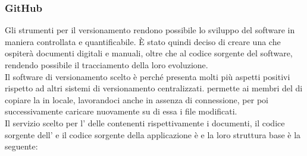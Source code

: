 \subsubsection{GitHub}
Gli strumenti per il versionamento rendono possibile lo sviluppo del software in maniera controllata e quantificabile. È stato quindi deciso di creare una  che ospiterà documenti digitali e manuali, oltre che al codice sorgente del software, rendendo possibile il tracciamento della loro evoluzione. \\
Il software di versionamento scelto è  perché presenta molti più aspetti positivi rispetto ad altri sistemi di versionamento centralizzati.  permette ai membri del  di copiare la  in locale, lavorandoci anche in assenza di connessione, per poi successivamente caricare nuovamente su di essa i file modificati. \\
Il servizio scelto per l' delle  contenenti rispettivamente i documenti, il codice sorgente dell' e il codice sorgente della applicazione  è  e la loro struttura base è la seguente:
